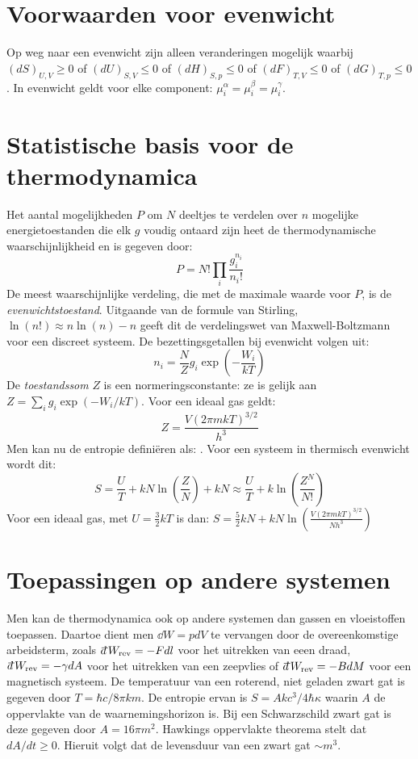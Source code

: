 \section{Voorwaarden voor evenwicht}
Op weg naar een evenwicht zijn alleen veranderingen mogelijk waarbij
$(dS)_{U,V}\geq0$ of $(dU)_{S,V}\leq0$ of $(dH)_{S,p}\leq0$ of
$(dF)_{T,V}\leq0$ of $(dG)_{T,p}\leq0$. In evenwicht geldt voor elke
component: $\mu_i^\alpha=\mu_i^\beta=\mu_i^\gamma$.

\section{Statistische basis voor de thermodynamica}
Het aantal mogelijkheden $P$ om $N$ deeltjes te verdelen over $n$ mogelijke
energietoestanden die elk $g$ voudig ontaard zijn heet de thermodynamische
waarschijnlijkheid en is gegeven door:
\[
P=N!\prod_i\frac{g_i^{n_i}}{n_i!}
\]
De meest waarschijnlijke verdeling, die met de maximale waarde voor $P$, is
de {\it evenwichtstoestand}. Uitgaande van de formule van Stirling,
$\ln(n!)\approx n\ln(n)-n$ geeft dit de verdelingswet van Maxwell-Boltzmann
voor een discreet systeem. De bezettingsgetallen bij evenwicht volgen uit:
\[
n_i=\frac{N}{Z}g_i\exp\left(-\frac{W_i}{kT}\right)
\]
De {\it toestandssom} $Z$ is een normeringsconstante: ze is gelijk aan
$Z=\sum\limits_ig_i\exp(-W_i/kT)$. Voor een ideaal gas geldt:
\[
Z=\frac{V(2\pi mkT)^{3/2}}{h^3}
\]
Men kan nu de entropie defini\"eren als: . Voor een
systeem in thermisch evenwicht wordt dit:
\[
S=\frac{U}{T}+kN\ln\left(\frac{Z}{N}\right)+kN\approx\frac{U}{T}+k\ln\left(\frac{Z^N}{N!}\right)
\]
Voor een ideaal gas, met $U=\frac{3}{2}kT$ is dan:
$\displaystyle S=\mbox{$\frac{5}{2}$}kN+kN\ln\left(\frac{V(2\pi mkT)^{3/2}}{Nh^3}\right)$

\section{Toepassingen op andere systemen}
Men kan de thermodynamica ook op andere systemen dan gassen en vloeistoffen
toepassen. Daartoe dient men $\dd W=pdV$ te vervangen door de overeenkomstige
arbeidsterm, zoals $\dd W_{\rm rev}=-Fdl$ voor het uitrekken van eeen draad,
$\dd W_{\rm rev}=-\gamma dA$ voor het uitrekken van een zeepvlies of
$\dd W_{\rm rev}=-BdM$ voor een magnetisch systeem.
\npar
De temperatuur van een roterend, niet geladen zwart gat is gegeven door
$T=\hbar c/8\pi km$. De entropie ervan is $S=Akc^3/4\hbar\kappa$ waarin $A$
de oppervlakte van de waarnemingshorizon is. Bij een Schwarzschild zwart gat
is deze gegeven door $A=16\pi m^2$. Hawkings oppervlakte theorema stelt dat
$dA/dt\geq0$.
\npar
Hieruit volgt dat de levensduur van een zwart gat $\sim m^3$.

